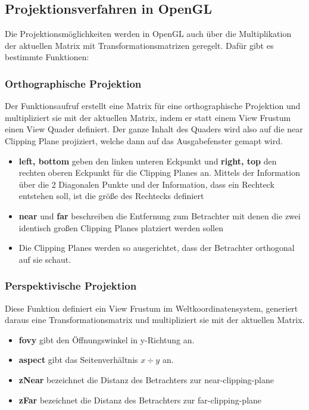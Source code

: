 \subsection{Projektionsverfahren in OpenGL}
Die Projektionsmöglichkeiten werden in OpenGL auch über die Multiplikation der aktuellen Matrix mit Transformationsmatrizen geregelt. Dafür gibt es bestimmte Funktionen:

\subsubsection*{Orthographische Projektion}



Der Funktionsaufruf erstellt eine Matrix für eine orthographische Projektion und multipliziert sie mit der aktuellen Matrix, indem er statt einem View Frustum einen View Quader definiert. Der ganze Inhalt des Quaders wird also auf die near Clipping Plane projiziert, welche dann auf das Ausgabefenster gemapt wird.

\begin{itemize}
    \item \textbf{left, bottom} geben den linken unteren Eckpunkt und \textbf{right, top} den rechten oberen Eckpunkt für die Clipping Planes an. Mittels der Information über die 2 Diagonalen Punkte und der Information, dass ein Rechteck entstehen soll, ist die größe des Rechtecks definiert
    \item \textbf{near} und \textbf{far} beschreiben die Entfernung zum Betrachter mit denen die zwei identisch großen Clipping Planes platziert werden sollen
    \item Die Clipping Planes werden so ausgerichtet, dass der Betrachter orthogonal auf sie schaut.
\end{itemize}

\subsubsection*{Perspektivische Projektion}



Diese Funktion definiert ein View Frustum im Weltkoordinatensystem, generiert daraus eine Transformationsmatrix und multipliziert sie mit der aktuellen Matrix.

\begin{itemize}
    \item \textbf{fovy} gibt den Öffnungswinkel in y-Richtung an.
    \item \textbf{aspect} gibt das Seitenverhältnis $x \div y$ an.
    \item \textbf{zNear} bezeichnet die Distanz des Betrachters zur near-clipping-plane
    \item \textbf{zFar} bezeichnet die Distanz des Betrachters zur far-clipping-plane
\end{itemize}

